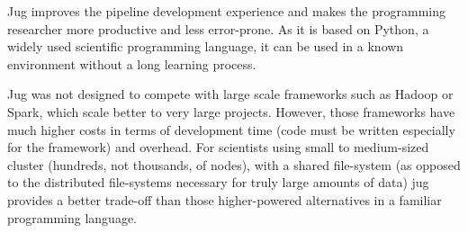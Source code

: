 \documentclass{article}
\begin{document}
Jug improves the pipeline development experience and makes the programming
researcher more productive and less error-prone. As it is based on Python, a
widely used scientific programming language, it can be used in a known
environment without a long learning process.

Jug was not designed to compete with large scale frameworks such as Hadoop or
Spark, which scale better to very large projects. However, those frameworks
have much higher costs in terms of development time (code must be written
especially for the framework) and overhead. For scientists using small to
medium-sized cluster (hundreds, not thousands, of nodes), with a shared
file-system (as opposed to the distributed file-systems necessary for truly
large amounts of data) jug provides a better trade-off than those
higher-powered alternatives in a familiar programming language.

\printbibliography
\end{document}
